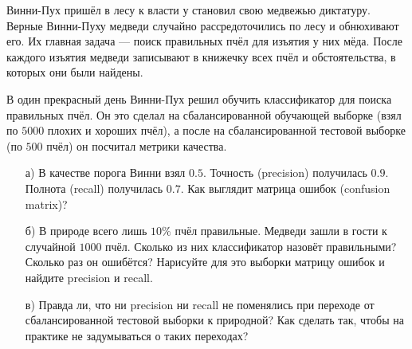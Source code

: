 \documentclass[12pt, a4paper, oneside]{article}
\theoremstyle{plain} %
\theoremstyle{definition}
\newcounter{problem}%
\renewcommand{\theproblem}{\arabic{problem}}
\newenvironment{problem}{
\addtocounter{problem}{1}\noindent{ \color{titleblue} \large \bfseries Упражнение~\theproblem \vspace{1ex} \newline}
}{ }
\begin{document}
\begin{problem} 
Винни-Пух пришёл в лесу к власти у становил свою медвежью диктатуру. Верные Винни-Пуху медведи случайно рассредоточились по лесу и обнюхивают его. Их главная задача --- поиск правильных пчёл для изъятия у них мёда. После каждого изъятия медведи записывают в книжечку всех пчёл и обстоятельства, в которых они были найдены. 

В один прекрасный день Винни-Пух решил обучить классификатор для поиска правильных пчёл. Он это сделал на сбалансированной обучающей выборке (взял по $5000$ плохих и хороших пчёл), а после на сбалансированной тестовой выборке (по $500$ пчёл) он посчитал метрики качества. 

\begin{enumerate} 
\item[а)] В качестве порога Винни взял $0.5$. Точность (precision) получилась $0.9$. Полнота (recall) получилась $0.7$. Как выглядит матрица ошибок (confusion matrix)? 

\item[б)] В природе всего лишь $10\%$ пчёл правильные. Медведи зашли в гости к случайной $1000$ пчёл. Сколько из них классификатор назовёт правильными? Сколько раз он ошибётся? Нарисуйте для это выборки матрицу ошибок и найдите precision и recall. 

\item[в)] Правда ли, что ни precision ни recall не поменялись при переходе от сбалансированной тестовой выборки к природной? Как сделать так, чтобы на практике не задумываться о таких переходах? 

\end{enumerate} 
\end{problem} 
\end{document}
